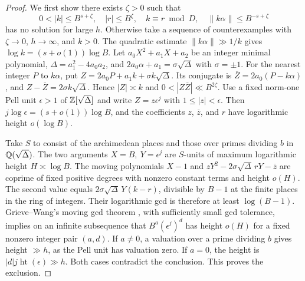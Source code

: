 \begin{proof}
We first show there exists \(\zeta>0\) such that
\[
 0<|k|\le B^{s+\zeta},\quad |r|\le B^\zeta,\quad
 k\equiv r\bmod D,\quad \|k\alpha\|\le B^{-s+\zeta}
\]
has no solution for large \(h\). Otherwise take a sequence of
counterexamples with \(\zeta\to0\), \(h\to\infty\), and \(k>0\).
The quadratic estimate \(\|k\alpha\|\gg 1/k\) gives
\(\log k=(s+o(1))\log B\).
Let \(a_0 X^2+a_1X+a_2\) be an integer minimal polynomial,
\(\Delta=a_1^2-4a_0a_2\), and \(2a_0\alpha+a_1=\sigma\sqrt\Delta\)
with \(\sigma=\pm1\). For the nearest integer \(P\) to \(k\alpha\),
put \(Z=2a_0P+a_1 k+\sigma k\sqrt\Delta\). Its conjugate is
\(\overline{Z}=2a_0(P-k\alpha)\), and
\(Z-\overline Z=2\sigma k\sqrt\Delta\).
Hence \(|Z|\asymp k\) and \(0<|Z\overline{Z}|\ll B^{2\zeta}\).
Use a fixed norm-one Pell unit \(\epsilon>1\) of
\(\mathbb Z[\sqrt\Delta]\) and write \(Z=z\epsilon^j\) with
\(1\le |z|<\epsilon\).
Then \(j\log\epsilon=(s+o(1))\log B\), and the coefficients \(z\),
\(\overline z\), and \(r\) have logarithmic height \(o(\log B)\).

Take \(S\) to consist of the archimedean places and those over
primes dividing \(b\) in \(\mathbb Q(\sqrt\Delta)\).
The two arguments \(X=B,\ Y=\epsilon^j\) are \(S\)-units of
maximum logarithmic height \(H\asymp\log B\).
The moving polynomials \(X-1\) and
\(zY^2-2\sigma\sqrt\Delta\,rY-\overline z\) are coprime of
fixed positive degrees with nonzero constant terms and height
\(o(H)\). The second value equals
\(2\sigma\sqrt\Delta\,Y(k-r)\), divisible by \(B-1\) at the
finite places in the ring of integers. Their logarithmic gcd
is therefore at least \(\log(B-1)\).
Grieve--Wang's moving gcd theorem
\cite[Theorem~1.2]{GrieveWang}, with sufficiently small
gcd tolerance, implies on an infinite subsequence that
\(B^a(\epsilon^j)^d\) has height \(o(H)\) for a fixed nonzero
integer pair \((a,d)\).
If \(a\ne0\), a valuation over a prime dividing \(b\) gives
height \(\gg h\), as the Pell unit has valuation zero.
If \(a=0\), the height is \(|d|j\operatorname{ht}(\epsilon)\gg h\).
Both cases contradict the conclusion. This proves the exclusion.


\end{proof}
